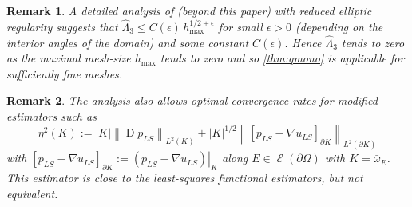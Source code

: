 \documentclass{siamltex1213}
\newtheorem{remark}{Remark}
\begin{document}
\begin{remark}\label{rem:appLS}
A detailed analysis of  \cite{CCP-lsfem} (beyond this paper) with reduced elliptic regularity
suggests that ${\ensuremath{\widehat{\Lambda}_{\mathrm{3}}}} \le C(\epsilon) \, h_{\max}^{1/2+\epsilon} $ for small $\epsilon>0$ (depending on the interior angles of the domain) and some constant $C(\epsilon)$. Hence  ${\ensuremath{\widehat{\Lambda}_{\mathrm{3}}}} $ tends to zero as the maximal
mesh-size $h_{\max}$ tends to zero and so \cref{thm:qmono} is applicable for sufficiently fine meshes.
\end{remark}
\begin{remark}
	The analysis also allows optimal convergence rates for modified estimators such as
	\[
		\eta^2(K):= {\left\lvert {K} \right\rvert} {\left\lVert {\operatorname{D} p_{LS}} \right\rVert_{{L^2(K)}}} + {\left\lvert {K} \right\rvert}^{1/2} {\left\lVert {[p_{LS}-\nabla u_{LS}]_{\partial K}} \right\rVert_{{L^2(\partial K)}}}
	\]
	with $[p_{LS}-\nabla u_{LS}]_{\partial K}:= {\left. {(p_{LS}-\nabla u_{LS})} \right\lvert_{{K}}}$ along $E \in \operatorname{\mathcal{E}}(\partial \Omega)$ with $K= \bar \omega_E$. This estimator is close to the least-squares functional estimators, but not equivalent.
\end{remark}



\end{document}
